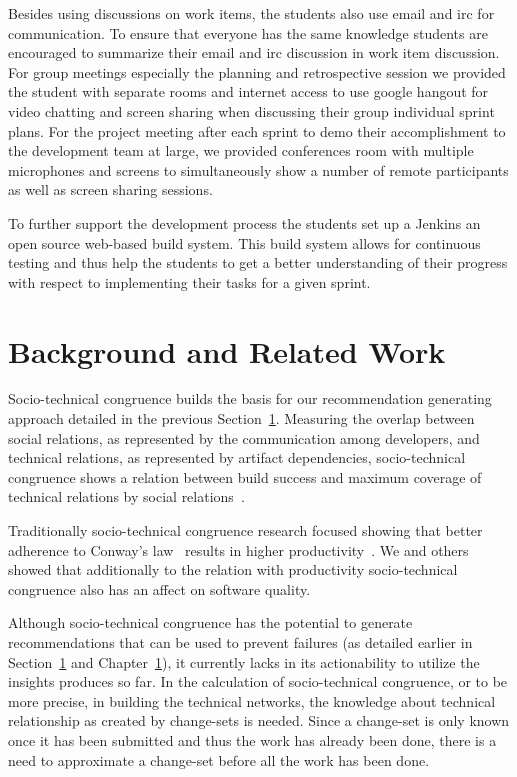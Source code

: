 Besides using discussions on work items, the students also use email and irc for communication.
To ensure that everyone has the same knowledge students are encouraged to summarize their email and irc discussion in work item discussion.
For group meetings especially the planning and retrospective session we provided the student with separate rooms and internet access to use google hangout for video chatting and screen sharing when discussing their group individual sprint plans.
For the project meeting after each sprint to demo their accomplishment to the development team at large, we provided conferences room with multiple microphones and screens to simultaneously show a number of remote participants as well as screen sharing sessions. 

To further support the development process the students set up a Jenkins an open source web-based build system.
This build system allows for continuous testing and thus help the students to get a better understanding of their progress with respect to implementing their tasks for a given sprint.

\section{Background and Related Work}
Socio-technical congruence builds the basis for our recommendation generating approach detailed in the previous Section~\ref{}.
Measuring the overlap between social relations, as represented by the communication among developers, and technical relations, as represented by artifact dependencies, socio-technical congruence shows a relation between build success and maximum coverage of technical relations by social relations~\cite{}.

Traditionally socio-technical congruence research focused showing that better adherence to Conway's law~\cite{} results in higher productivity~\cite{}.
We and others showed that additionally to the relation with productivity socio-technical congruence also has an affect on software quality.  

Although socio-technical congruence has the potential to generate recommendations that can be used to prevent failures (as detailed earlier in Section~\ref{} and Chapter~\ref{}), it currently lacks in its actionability to utilize the insights produces so far.
In the calculation of socio-technical congruence, or to be more precise, in building the technical networks, the knowledge about technical relationship as created by change-sets is needed.
Since a change-set is only known once it has been submitted and thus the work has already been done, there is a need to approximate a change-set before all the work has been done.

